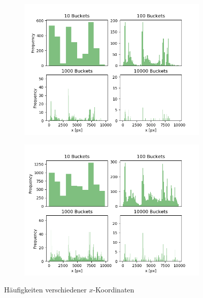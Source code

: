 
\vspace*{-0.6cm}
\begin{figure}[H]
\centering
	\begin{subfigure}[t]{0.47\textwidth}
	\begin{flushright}
		\includegraphics[scale=0.5]{Bilder/x_distribution_v1.png}
	\end{flushright}
	\end{subfigure}
	\begin{subfigure}[t]{0.47\textwidth}
	\begin{flushleft}
		\includegraphics[scale=0.5]{Bilder/x_distribution_v2.png}
	\end{flushleft}
	\end{subfigure}
\caption{Häufigkeiten verschiedener $x$-Koordinaten}
\end{figure}


